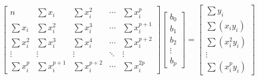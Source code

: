 \documentclass[10pt,a4paper]{article}
\begin{document}
\[
\begin{bmatrix}
n & \sum x_i & \sum x_i^2 & \cdots & \sum x_i^p \\
\sum x_i & \sum x_i^2 & \sum x_i^3 & \cdots & \sum x_i^{p+1} \\
\sum x_i^2 & \sum x_i^3 & \sum x_i^4 & \cdots & \sum x_i^{p+2} \\
\vdots & \vdots & \vdots & \ddots & \vdots \\
\sum x_i^p & \sum x_i^{p+1} & \sum x_i^{p+2} & \cdots & \sum x_i^{2p}
\end{bmatrix}
\begin{bmatrix} b_0 \\ b_1 \\ b_2 \\ \vdots \\ b_p \end{bmatrix}
=
\begin{bmatrix} \sum y_i \\ \sum (x_i y_i) \\ \sum (x_i^2 y_i) \\ \vdots \\ \sum (x_i^p y_i) \end{bmatrix}
\]
\end{document}
